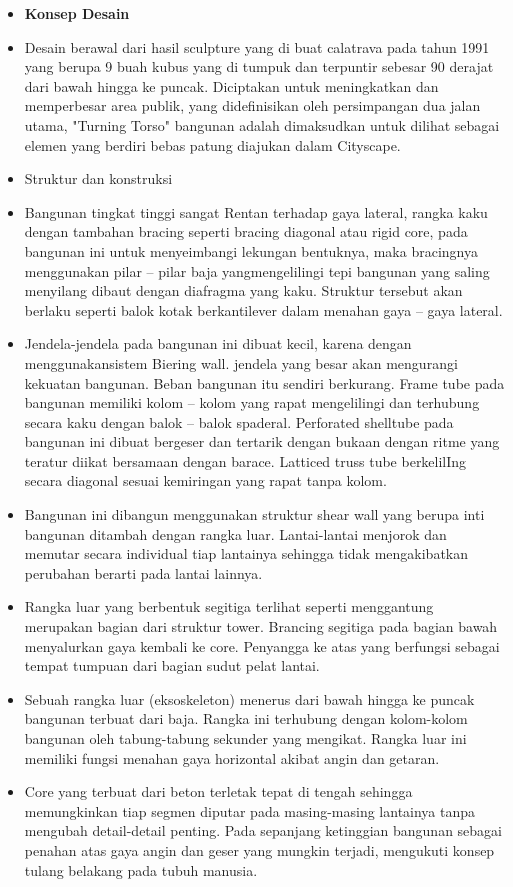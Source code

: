 \documentclass[../modul_skb.tex]{subfiles}
\begin{document}
\begin{itemize}
	\item \textbf{Konsep Desain}
	\item[] Desain berawal dari hasil sculpture yang di buat calatrava pada tahun 1991 yang berupa 9 buah kubus yang di tumpuk dan terpuntir sebesar 90 derajat dari bawah hingga ke puncak. Diciptakan untuk meningkatkan dan memperbesar area publik, yang didefinisikan oleh persimpangan dua jalan utama, "Turning Torso" bangunan adalah dimaksudkan untuk dilihat sebagai elemen yang berdiri bebas patung diajukan dalam Cityscape.

	\item Struktur dan konstruksi

	\item[] Bangunan tingkat tinggi sangat Rentan terhadap gaya lateral, rangka kaku dengan tambahan bracing seperti bracing diagonal atau rigid core, pada bangunan ini untuk menyeimbangi lekungan bentuknya, maka bracingnya menggunakan pilar – pilar baja yangmengelilingi tepi bangunan yang saling menyilang dibaut dengan diafragma yang kaku. Struktur tersebut akan berlaku seperti balok kotak berkantilever dalam menahan gaya – gaya lateral.
	\item[] Jendela-jendela pada bangunan ini dibuat kecil, karena dengan menggunakansistem Biering wall. jendela yang besar akan mengurangi kekuatan bangunan. Beban bangunan itu sendiri berkurang. Frame tube pada bangunan memiliki kolom – kolom yang rapat mengelilingi dan terhubung secara kaku dengan balok – balok spaderal. Perforated shelltube pada bangunan ini dibuat bergeser dan tertarik dengan bukaan dengan ritme yang teratur diikat bersamaan dengan barace. Latticed truss tube berkelilIng secara diagonal sesuai kemiringan yang rapat tanpa kolom.

	\item[]  Bangunan ini dibangun menggunakan struktur shear wall yang berupa inti bangunan ditambah dengan rangka luar. Lantai-lantai menjorok dan memutar secara individual tiap lantainya sehingga tidak mengakibatkan perubahan berarti pada lantai lainnya.
	\item[]  Rangka luar yang berbentuk segitiga terlihat seperti menggantung merupakan bagian dari struktur tower. Brancing segitiga pada bagian bawah menyalurkan gaya kembali ke core. Penyangga ke atas yang berfungsi sebagai tempat tumpuan dari bagian sudut pelat lantai.

	\item[] Sebuah rangka luar (eksoskeleton) menerus dari bawah hingga ke puncak bangunan terbuat dari baja. Rangka ini terhubung dengan kolom-kolom bangunan oleh tabung-tabung sekunder yang mengikat. Rangka luar ini memiliki fungsi menahan gaya horizontal akibat angin dan getaran.

	\item[] Core yang terbuat dari beton terletak tepat di tengah sehingga memungkinkan tiap segmen diputar pada masing-masing lantainya tanpa mengubah detail-detail penting. Pada sepanjang ketinggian bangunan sebagai penahan atas gaya angin dan geser yang mungkin terjadi, mengukuti konsep tulang belakang pada tubuh manusia.
\end{itemize}




\end{document}
